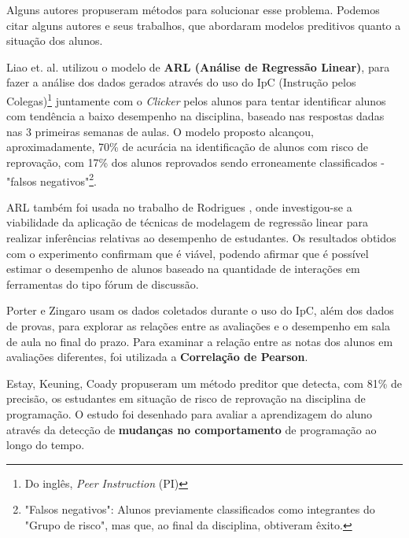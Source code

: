 \documentclass[
	12pt,				%
	openright,			%
	oneside,
	a4paper,			%
	english,			%
	french,				%
	spanish,			%
	brazil,				%
	]{abntex2}
\begin{document}
Alguns autores propuseram métodos para solucionar esse problema. Podemos citar alguns autores e seus trabalhos, que abordaram modelos preditivos quanto a situação dos alunos.

Liao et. al. \cite{liao2016lightweight} utilizou o modelo de \textbf{ARL (Análise de Regressão Linear)}, para fazer a análise dos dados gerados através do uso do IpC (Instrução pelos Colegas)\footnote[1]{Do inglês, \textit{Peer Instruction} (PI)} juntamente com o \textit{Clicker} pelos alunos para tentar identificar alunos com tendência a baixo desempenho na disciplina, baseado nas respostas dadas nas 3 primeiras semanas de aulas. O modelo proposto alcançou, aproximadamente, 70\% de acurácia na identificação de alunos com risco de reprovação, com 17\% dos alunos reprovados sendo erroneamente classificados - "falsos negativos"\footnote[2]{"Falsos negativos": Alunos previamente classificados como integrantes do "Grupo de risco", mas que, ao final da disciplina, obtiveram êxito.}.

ARL também foi usada no trabalho de Rodrigues \cite{rodrigues2013modelo}, onde investigou-se a viabilidade da aplicação de técnicas de modelagem de regressão linear para realizar inferências relativas ao desempenho de estudantes. Os resultados obtidos com o experimento confirmam que é viável, podendo afirmar que é possível estimar o desempenho de alunos baseado na quantidade de interações em ferramentas do tipo fórum de discussão. 

Porter e Zingaro \cite{porter2014importance} usam os dados coletados durante o uso do IpC, além dos dados de provas, para explorar as relações entre as avaliações e o desempenho em sala de aula no final do prazo. Para examinar a relação entre as notas dos alunos em avaliações diferentes, foi utilizada a \textbf{Correlação de Pearson}.

Estay, Keuning, Coady \cite{estey2017automatically} propuseram um método preditor que detecta, com 81\% de precisão, os estudantes em situação de risco de reprovação na disciplina de programação. O estudo foi desenhado para avaliar a aprendizagem do aluno através da detecção de \textbf{mudanças no comportamento} de programação ao longo do tempo. 
\end{document}

